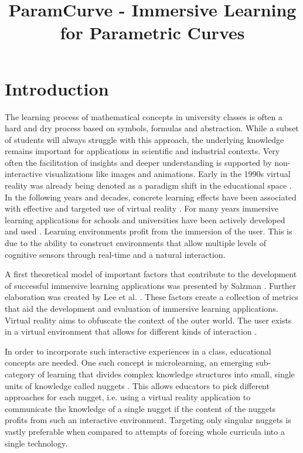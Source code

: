 \documentclass{VRARWorkshop}
\title{ParamCurve - Immersive Learning for Parametric Curves}
\begin{document}

\section{Introduction}

The learning process of mathematical concepts in university classes is often a hard and dry process based on symbols, formulas and abstraction.
While a subset of students will always struggle with this approach, the underlying knowledge remains important for applications in scientific and industrial contexts.
Very often the facilitation of insights and deeper understanding is supported by non-interactive visualizations like images and animations. 
Early in the 1990s virtual reality was already being denoted as a paradigm shift in the educational space \cite{Bricken1992}. 
In the following years and decades, concrete learning effects have been associated with effective and targeted use
of virtual reality \cite{Mikropoulos2011, Merchant2014}.
For many years immersive learning applications for schools and universities have been actively
developed and used \cite{ILRN_21}.
Learning environments profit from the immersion of the user.
This is due to the ability to construct environments that allow multiple levels of cognitive sensors through 
real-time and a natural interaction.

A first theoretical model of important factors that contribute to the development of successful immersive learning applications was presented by Salzman \cite{Salzman1999}. 
Further elaboration was created by Lee et al. \cite{Lee2010}. 
These factors create a collection of metrics that aid the development and evaluation of immersive learning applications. 
Virtual reality aims to obfuscate the context of the outer world.
The user exists in a virtual environment that allows for different kinds of interaction \cite{Ren2015}. 

In order to incorporate such interactive experiences in a class, educational concepts are needed.
One such concept is microlearning, an emerging sub-category of learning that divides complex knowledge structures into small, single units of knowledge called nuggets \cite{Horst2019}. 
This allows educators to pick different approaches for each nugget, i.e. using a virtual reality application to communicate the knowledge of a single nugget if the content of the nuggets profits from such an interactive environment. 
Targeting only singular nuggets is vastly preferable when compared to attempts of forcing whole curricula into a single technology.
%
\end{document}
